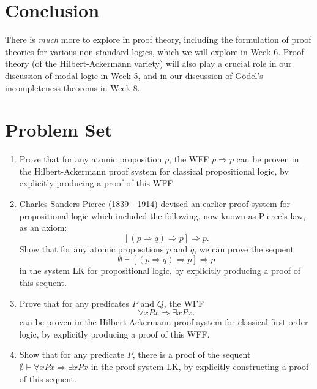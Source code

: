 \documentclass[11pt]{article}
\theoremstyle{definition}
\theoremstyle{remark}
\begin{document}
\section{Conclusion}
There is \textit{much} more to explore in proof theory, including the formulation of proof theories for various non-standard logics, which we will explore in Week 6. Proof theory (of the Hilbert-Ackermann variety) will also play a crucial role in our discussion of modal logic in Week 5, and in our discussion of G\"odel's incompleteness theorems in Week 8.\par

\section*{Problem Set}
\begin{enumerate}
    \item Prove that for any atomic proposition $p$, the WFF $p\Rightarrow p$ can be proven in the Hilbert-Ackermann proof system for classical propositional logic, by explicitly producing a proof of this WFF.

    \item Charles Sanders Pierce (1839 - 1914) devised an earlier proof system for propositional logic which included the following, now known as Pierce's law, as an axiom:
    $$\left[(p\Rightarrow q)\Rightarrow p\right]\Rightarrow p.$$
    Show that for any atomic propositions $p$ and $q$, we can prove the sequent $$\emptyset\vdash \left[(p\Rightarrow q)\Rightarrow p\right]\Rightarrow p$$ in the system LK for propositional logic, by explicitly producing a proof of this sequent.

    \item Prove that for any predicates $P$ and $Q$, the WFF $$\forall x Px \Rightarrow\exists x Px.$$ can be proven in the Hilbert-Ackermann proof system for classical first-order logic, by explicitly producing a proof of this WFF.

    \item Show that for any predicate $P$, there is a proof of the sequent $\emptyset\vdash \forall x Px \Rightarrow\exists x Px$
    in the proof system LK, by explicitly constructing a proof of this sequent.
\end{enumerate}
\end{document}
